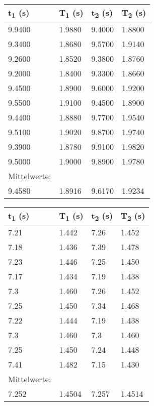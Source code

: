 \documentclass[titlepage=firstcover, captions=tableheading]{scrartcl}
\begin{document}
\begin{center}
    \begin{tabular}{llll}
        \toprule
        t\textsubscript{1} (s) & T\textsubscript{1} (s) & t\textsubscript{2} (s) & T\textsubscript{2} (s) \\
        \midrule
        9.9400  &    1.9880  & 9.4000 & 1.8800 \\
        9.3400  &    1.8680  & 9.5700 & 1.9140 \\
        9.2600  &    1.8520  &	9.3800 & 1.8760 \\
        9.2000  &    1.8400  & 9.3300 & 1.8660 \\
        9.4500  &    1.8900  & 9.6000 & 1.9200 \\
        9.5500  &    1.9100  & 9.4500 & 1.8900 \\
        9.4400  &    1.8880  & 9.7700 & 1.9540 \\
        9.5100  &    1.9020  & 9.8700 & 1.9740 \\
        9.3900  &    1.8780  & 9.9100 & 1.9820 \\
        9.5000  &    1.9000  & 9.8900 & 1.9780 \\
        \midrule
        Mittelwerte:\\
        9.4580 & 1.8916 & 9.6170 & 1.9234  \\
        \bottomrule
        
    \end{tabular}
\end{center}

\begin{center}
    \begin{tabular}{llll}
        \toprule
        t\textsubscript{1} (s) & T\textsubscript{1} (s) & t\textsubscript{2} (s) & T\textsubscript{2} (s) \\
        \midrule
        7.21 & 1.442 & 7.26 & 1.452\\
        7.18 & 1.436 & 7.39 & 1.478\\
        7.23 & 1.446 & 7.25 & 1.450\\
        7.17 & 1.434 & 7.19 & 1.438\\
        7.3  & 1.460 & 7.26 & 1.452\\
        7.25 & 1.450 & 7.34 & 1.468\\
        7.22 & 1.444 & 7.19 & 1.438\\
        7.3  & 1.460 & 7.3  & 1.460\\
        7.25 & 1.450 & 7.24 & 1.448\\
        7.41 & 1.482 & 7.15 & 1.430\\
        \midrule
        Mittelwerte:\\
        7.252 & 1.4504 & 7.257 & 1.4514  \\
        \bottomrule
        
    \end{tabular}
\end{center}
\end{document}
